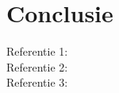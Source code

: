 \section{Conclusie}

Referentie 1: \citep{rogers2011interaction}\\
Referentie 2: \citep{geenadavis}\\
Referentie 3: \cite{lindner2017movies}